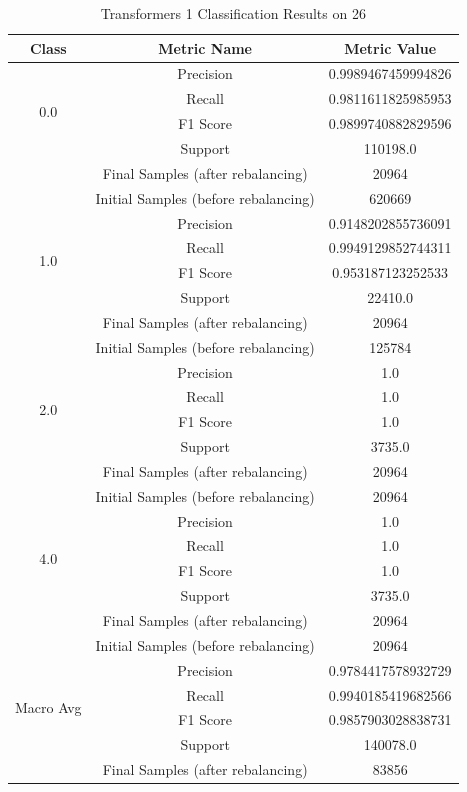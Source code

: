 \begin{longtable}{|c|c|c|}
\caption{Transformers 1 Classification Results on 26} \label{tab:26_transformers_1_classifiers_results} \\
\hline
Class & Metric Name & Metric Value \\
\hline
\multirow{4}{*}{0.0} & Precision & 0.9989467459994826 \\
 & Recall & 0.9811611825985953 \\
 & F1 Score & 0.9899740882829596 \\
 & Support & 110198.0 \\
 & Final Samples (after rebalancing) & 20964 \\
 & Initial Samples (before rebalancing) & 620669 \\
\hline
\multirow{4}{*}{1.0} & Precision & 0.9148202855736091 \\
 & Recall & 0.9949129852744311 \\
 & F1 Score & 0.953187123252533 \\
 & Support & 22410.0 \\
 & Final Samples (after rebalancing) & 20964 \\
 & Initial Samples (before rebalancing) & 125784 \\
\hline
\multirow{4}{*}{2.0} & Precision & 1.0 \\
 & Recall & 1.0 \\
 & F1 Score & 1.0 \\
 & Support & 3735.0 \\
 & Final Samples (after rebalancing) & 20964 \\
 & Initial Samples (before rebalancing) & 20964 \\
\hline
\multirow{4}{*}{4.0} & Precision & 1.0 \\
 & Recall & 1.0 \\
 & F1 Score & 1.0 \\
 & Support & 3735.0 \\
 & Final Samples (after rebalancing) & 20964 \\
 & Initial Samples (before rebalancing) & 20964 \\
\hline
\multirow{4}{*}{Macro Avg} & Precision & 0.9784417578932729 \\
 & Recall & 0.9940185419682566 \\
 & F1 Score & 0.9857903028838731 \\
 & Support & 140078.0 \\
 & Final Samples (after rebalancing) & 83856 \\

\end{longtable}
